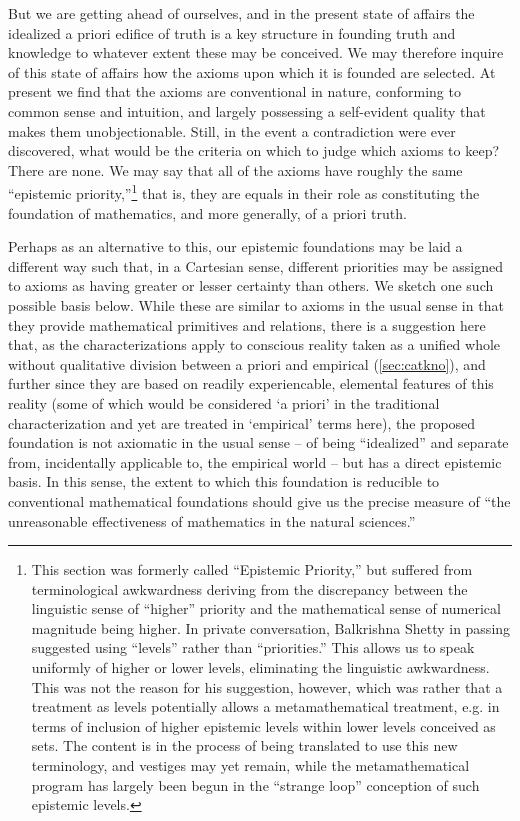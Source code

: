 \documentclass[pra,twocolumn,groupedaddress,10pt]{revtex4}
\theoremstyle{definition}
\begin{document}
But we are getting ahead of ourselves, and in the present state of affairs the idealized a priori edifice of truth is a key structure in founding truth and knowledge to whatever extent these may be conceived. We may therefore inquire of this state of affairs how the axioms upon which it is founded are selected. At present we find that the axioms are conventional in nature, conforming to common sense and intuition, and largely possessing a self-evident quality that makes them unobjectionable. Still, in the event a contradiction were ever discovered, what would be the criteria on which to judge which axioms to keep? There are none. We may say that all of the axioms have roughly the same ``epistemic priority,''\footnote{This section was formerly called ``Epistemic Priority,'' but suffered from terminological awkwardness deriving from the discrepancy between the linguistic sense of ``higher'' priority and the mathematical sense of numerical magnitude being higher. In private conversation, Balkrishna Shetty in passing suggested using ``levels'' rather than ``priorities.'' This allows us to speak uniformly of higher or lower levels, eliminating the linguistic awkwardness. This was not the reason for his suggestion, however, which was rather that a treatment as levels potentially allows a metamathematical treatment, e.g. in terms of inclusion of higher epistemic levels within lower levels conceived as sets. The content is in the process of being translated to use this new terminology, and vestiges may yet remain, while the metamathematical program has largely been begun in the ``strange loop'' conception of such epistemic levels.} that is, they are equals in their role as constituting the foundation of mathematics, and more generally, of a priori truth.

Perhaps as an alternative to this, our epistemic foundations may be laid a different way such that, in a Cartesian sense, different priorities may be assigned to axioms as having greater or lesser certainty than others. We sketch one such possible basis below. While these are similar to axioms in the usual sense in that they provide mathematical primitives and relations, there is a suggestion here that, as the characterizations apply to conscious reality taken as a unified whole without qualitative division between a priori and empirical (\autoref{sec:catkno}), and further since they are based on readily experiencable, elemental features of this reality (some of which would be considered `a priori' in the traditional characterization and yet are treated in `empirical' terms here), the proposed foundation is not axiomatic in the usual sense -- of being ``idealized'' and separate from, incidentally applicable to, the empirical world -- but has a direct epistemic basis. In this sense, the extent to which this foundation is reducible to conventional mathematical foundations should give us the precise measure of ``the unreasonable effectiveness of mathematics in the natural sciences.''\cite{wigner}
\end{document}
